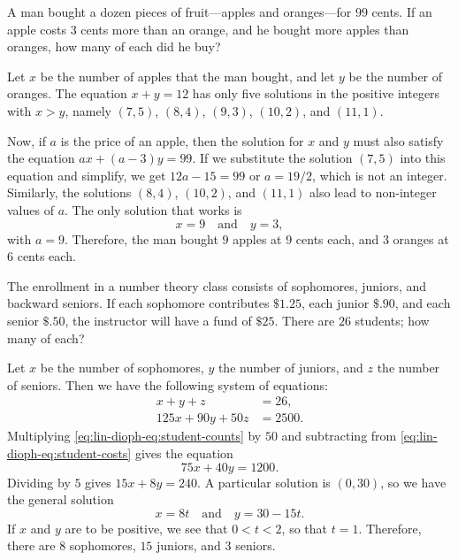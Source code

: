  A man bought a dozen pieces of fruit---apples and
oranges---for $99$ cents. If an apple costs $3$ cents more than an
orange, and he bought more apples than oranges, how many of each did
he buy?
\begin{solution}
  Let $x$ be the number of apples that the man bought, and let $y$ be
  the number of oranges. The equation $x + y = 12$ has only five
  solutions in the positive integers with $x > y$, namely $(7,5)$,
  $(8,4)$, $(9,3)$, $(10,2)$, and $(11,1)$.

  Now, if $a$ is the price of an apple, then the solution for $x$ and
  $y$ must also satisfy the equation $ax + (a-3)y = 99$. If we
  substitute the solution $(7,5)$ into this equation and simplify, we
  get $12a - 15 = 99$ or $a = 19/2$, which is not an
  integer. Similarly, the solutions $(8,4)$, $(10,2)$, and $(11,1)$
  also lead to non-integer values of $a$. The only solution that works
  is
  \begin{equation*}
    x = 9 \quad\text{and}\quad y = 3,
  \end{equation*}
  with $a = 9$. Therefore, the man bought $9$ apples at $9$ cents
  each, and $3$ oranges at $6$ cents each.
\end{solution}

 The enrollment in a number theory class consists of
sophomores, juniors, and backward seniors. If each sophomore
contributes $\$1.25$, each junior $\$.90$, and each senior $\$.50$,
the instructor will have a fund of $\$25$. There are $26$ students;
how many of each?
\begin{solution}
  Let $x$ be the number of sophomores, $y$ the number of juniors, and
  $z$ the number of seniors. Then we have the following system of
  equations:
  \begin{align}
    \label{eq:lin-dioph-eq:student-counts}
    x + y + z &= 26, \\
    \label{eq:lin-dioph-eq:student-costs}
    125x + 90y + 50z &= 2500.
  \end{align}
  Multiplying \eqref{eq:lin-dioph-eq:student-counts} by $50$ and
  subtracting from \eqref{eq:lin-dioph-eq:student-costs} gives the
  equation
  \begin{equation*}
    75x + 40y = 1200.
  \end{equation*}
  Dividing by $5$ gives $15x + 8y = 240$. A particular solution is
  $(0,30)$, so we have the general solution
  \begin{equation*}
    x = 8t \quad\text{and}\quad y = 30 - 15t.
  \end{equation*}
  If $x$ and $y$ are to be positive, we see that $0 < t < 2$, so that
  $t = 1$. Therefore, there are $8$ sophomores, $15$ juniors, and $3$
  seniors.
\end{solution}


